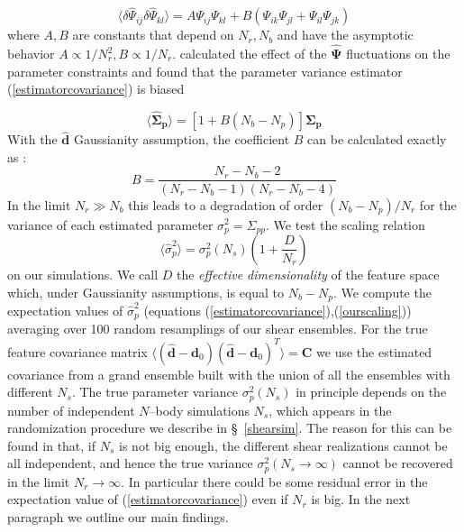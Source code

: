 \documentclass[reprint,aps,prd,superscriptaddress,showkeys,showpacs]{revtex4-1}
\newcommand{\bb}[1]{\mathbf{#1}}
\newcommand{\bbh}[1]{\mathbf{\hat{#1}}}
\newcommand{\h}[1]{\hat{#1}}
\begin{document}
\begin{equation}
\langle\delta\h{\Psi}_{ij}\delta\h{\Psi}_{kl}\rangle = A\Psi_{ij}\Psi_{kl} + B(\Psi_{ik}\Psi_{jl} + \Psi_{il}\Psi_{jk})
\end{equation}
%
where $A,B$ are constants that depend on $N_r,N_b$ and have the asymptotic behavior $A\propto1/N_r^2,B\propto1/N_r$. \citep{DodelsonSchneider13} calculated the effect of the $\bbh{\Psi}$ fluctuations on the parameter constraints and found that the parameter variance estimator (\ref{estimatorcovariance}) is biased

\begin{equation}
\label{dodelsonscaling}
\langle\bbh{\Sigma}_\bb{p}\rangle = \left[1+B(N_b-N_p)\right]\bb{\Sigma}_\bb{p}
\end{equation} 
%
With the $\bbh{d}$ Gaussianity assumption, the coefficient $B$ can be calculated exactly as \citep{DodelsonSchneider13,Taylor12}:
\begin{equation}
B = \frac{N_r-N_b-2}{(N_r-N_b-1)(N_r-N_b-4)}
\end{equation}
%
In the limit $N_r\gg N_b$ this leads to a degradation of order $(N_b-N_p)/N_r$ for the variance of each estimated parameter $\sigma^2_p=\Sigma_{pp}$. We test the scaling relation
\begin{equation}
\label{ourscaling}
\langle\h{\sigma}_p^2\rangle = \sigma^2_p(N_s)\left(1+\frac{D}{N_r}\right)
\end{equation}
%
on our simulations. We call $D$ the \textit{effective dimensionality} of the feature space which, under Gaussianity assumptions, is equal to $N_b-N_p$. We compute the expectation values of $\h{\sigma}^2_p$ (equations (\ref{estimatorcovariance}),(\ref{ourscaling})) averaging over 100 random resamplings of our shear ensembles. For the true feature covariance matrix $\langle(\bbh{d}-\bb{d}_0)(\bbh{d}-\bb{d}_0)^T\rangle=\bb{C}$ we use the estimated covariance from a grand ensemble built with the union of all the ensembles with different $N_s$. 
The true parameter variance $\sigma^2_p(N_s)$ in principle depends on the number of independent $N$--body simulations $N_s$, which appears in the randomization procedure we describe in \S~\ref{shearsim}. The reason for this can be found in that, if $N_s$ is not big enough, the different shear realizations cannot be all independent, and hence the true variance $\sigma^2_p(N_s\rightarrow\infty)$ cannot be recovered in the limit $N_r\rightarrow\infty$. In particular there could be some residual error in the expectation value of (\ref{estimatorcovariance}) even if $N_r$ is big. In the next paragraph we outline our main findings.
 
\end{document}
